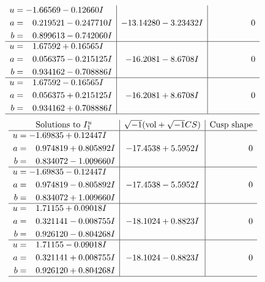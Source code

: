 \documentclass[1p]{elsarticle_modified}
\theoremstyle{definition}
\newcommand{\I}{\sqrt{-1}}
\begin{document}
$$\begin{array}{c|c|c}
\begin{aligned}
u &= -1.66569 - 0.12660 I \\
a &= \phantom{-}0.219521 - 0.247710 I \\
b &= \phantom{-}0.899613 - 0.742060 I\end{aligned}
 & -13.14280 - 3.23432 I & \phantom{-0.000000 } 0 \\ \hline\begin{aligned}
u &= \phantom{-}1.67592 + 0.16565 I \\
a &= \phantom{-}0.056375 - 0.215125 I \\
b &= \phantom{-}0.934162 - 0.708886 I\end{aligned}
 & -16.2081 - 8.6708 I & \phantom{-0.000000 } 0 \\ \hline\begin{aligned}
u &= \phantom{-}1.67592 - 0.16565 I \\
a &= \phantom{-}0.056375 + 0.215125 I \\
b &= \phantom{-}0.934162 + 0.708886 I\end{aligned}
 & -16.2081 + 8.6708 I & \phantom{-0.000000 } 0\\
 \hline 
 \end{array}$$\newpage$$\begin{array}{c|c|c}  
\text{Solutions to }I^u_{1}& \I (\text{vol} + \sqrt{-1}CS) & \text{Cusp shape}\\
 \hline 
\begin{aligned}
u &= -1.69835 + 0.12447 I \\
a &= \phantom{-}0.974819 + 0.805892 I \\
b &= \phantom{-}0.834072 - 1.009660 I\end{aligned}
 & -17.4538 + 5.5952 I & \phantom{-0.000000 } 0 \\ \hline\begin{aligned}
u &= -1.69835 - 0.12447 I \\
a &= \phantom{-}0.974819 - 0.805892 I \\
b &= \phantom{-}0.834072 + 1.009660 I\end{aligned}
 & -17.4538 - 5.5952 I & \phantom{-0.000000 } 0 \\ \hline\begin{aligned}
u &= \phantom{-}1.71155 + 0.09018 I \\
a &= \phantom{-}0.321141 - 0.008755 I \\
b &= \phantom{-}0.926120 - 0.804268 I\end{aligned}
 & -18.1024 + 0.8823 I & \phantom{-0.000000 } 0 \\ \hline\begin{aligned}
u &= \phantom{-}1.71155 - 0.09018 I \\
a &= \phantom{-}0.321141 + 0.008755 I \\
b &= \phantom{-}0.926120 + 0.804268 I\end{aligned}
 & -18.1024 - 0.8823 I & \phantom{-0.000000 } 0\\
 \hline 
 \end{array}$$\newpage\newpage\renewcommand{\arraystretch}{1}
\end{document}
